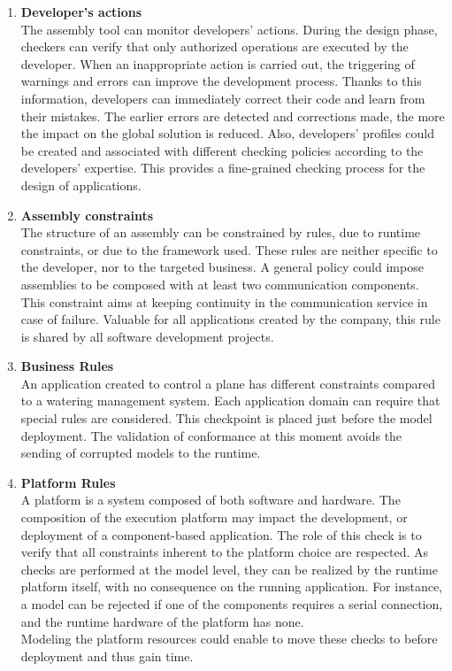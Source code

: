 \begin{enumerate}
\item {\bf Developer's actions}\\
The assembly tool can monitor developers' actions. During the design phase, checkers can verify that only authorized operations are executed by the developer. When an inappropriate action is carried out, the triggering of warnings and errors can improve the development process. Thanks to this information, developers can immediately correct their code and learn from their mistakes. The earlier errors are detected and corrections made, the more the impact on the global solution is reduced. Also, developers' profiles could be created and associated with different checking policies according to the developers' expertise. This provides a fine-grained checking process for the design of applications.

\item {\bf Assembly constraints}\\
The structure of an assembly can be constrained by rules, due to runtime constraints, or due to the framework used. These rules are neither specific to the developer, nor to the targeted business. A general policy could impose assemblies to be composed with at least two communication components. This constraint aims at keeping continuity in the communication service in case of failure. Valuable for all applications created by the company, this rule is shared by all software development projects.

\item {\bf Business Rules}\\
An application created to control a plane has different constraints compared to a watering management system. Each application domain can require that special rules are considered. This checkpoint is placed just before the model deployment. The validation of conformance at this moment avoids the sending of corrupted models to the runtime.

\item {\bf Platform Rules}\\
A platform is a system composed of both software and hardware. The composition of the execution platform may impact the development, or deployment of a component-based application. The role of this check is to verify that all constraints inherent to the platform choice are respected. As checks are performed at the model level, they can be realized by the runtime platform itself, with no consequence on the running application. For instance, a model can be rejected if one of the components requires a serial connection, and the runtime hardware of the platform has none.\\
Modeling the platform resources could enable to move these checks to before deployment and thus gain time.


\end{enumerate}
